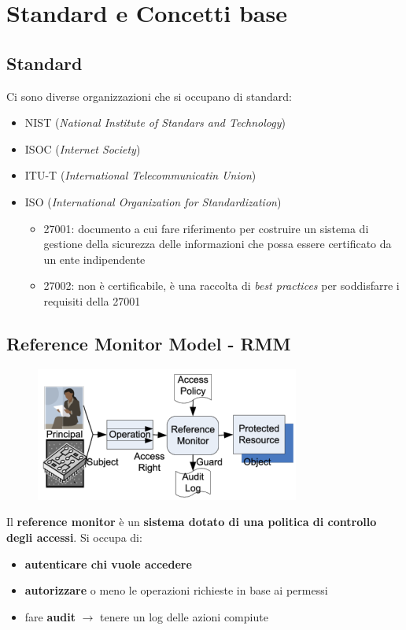 \chapter{Standard e Concetti base}

\section{Standard}
Ci sono diverse organizzazioni che si occupano di standard:
\begin{itemize}
    \item NIST (\textit{National Institute of Standars and Technology})
    \item ISOC (\textit{Internet Society})
    \item ITU-T (\textit{International Telecommunicatin Union})
    \item ISO (\textit{International Organization for Standardization})
    \begin{itemize}
        \item 27001: documento a cui fare riferimento per costruire un sistema di gestione 
        della sicurezza delle informazioni che possa essere certificato da un ente indipendente 
        \item 27002: non è certificabile, è una raccolta di \textit{best practices} per 
        soddisfarre i requisiti della 27001
    \end{itemize}
\end{itemize}

\section{Reference Monitor Model - RMM}

\begin{figure}[H]
    \centering
    \includegraphics[width=0.75\linewidth]{chapters/2/images/rmm.png}
\end{figure}

Il \textbf{reference monitor} è un \textbf{sistema dotato di una politica di controllo 
degli accessi}. Si occupa di:
\begin{itemize}
    \item \textbf{autenticare chi vuole accedere}
    \item \textbf{autorizzare} o meno le operazioni richieste in base ai permessi 
    \item fare \textbf{audit} $\rightarrow$ tenere un log delle azioni compiute
\end{itemize}

